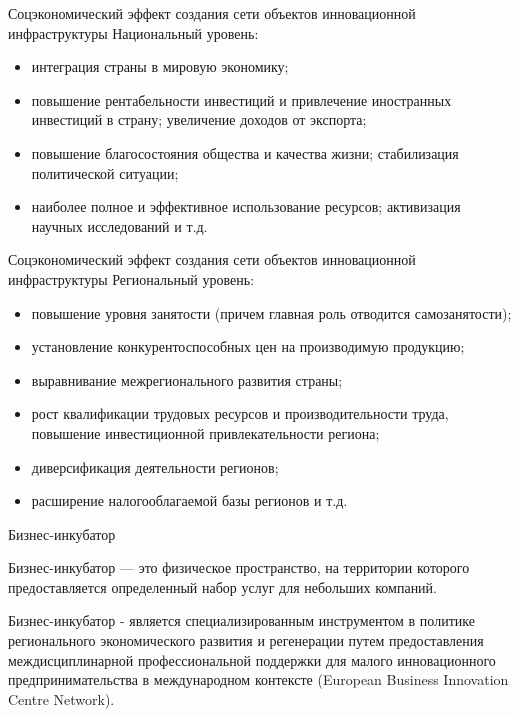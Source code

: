 \documentclass[_Venture_p3.tex]{subfiles}
\begin{document}
\begin{frame}[allowframebreaks]{Соцэкономический эффект }{создания сети объектов инновационной инфраструктуры}
Национальный уровень:
\begin{itemize}
	\item интеграция страны в мировую экономику;
	\item повышение рентабельности инвестиций и привлечение иностранных инвестиций в страну; увеличение доходов от экспорта;
	\pagebreak
	\item повышение благосостояния общества и качества жизни; стабилизация политической ситуации;
	\item наиболее полное и эффективное использование ресурсов; активизация научных исследований и т.д.
\end{itemize}
\end{frame}


\begin{frame}[allowframebreaks]{Соцэкономический эффект }{создания сети объектов инновационной инфраструктуры}
Региональный уровень:
\begin{itemize}
	\item повышение уровня занятости (причем главная роль отводится самозанятости);
	\item установление конкурентоспособных цен на производимую продукцию; 
	\item выравнивание межрегионального развития страны;
	
	\pagebreak
	\item рост квалификации трудовых ресурсов и производительности труда, повышение инвестиционной привлекательности региона; 
	\item диверсификация деятельности регионов;
	\item расширение налогооблагаемой базы регионов и т.д.	
\end{itemize}
\end{frame}


 

\begin{frame}[allowframebreaks]{Бизнес-инкубатор}{}
\begin{block}{Бизнес-инкубатор}
	\quad
	— это физическое пространство, на территории которого предоставляется определенный набор услуг для небольших компаний.
\end{block}

\pagebreak


\begin{block}{Бизнес-инкубатор}
	\quad
	-  является специализированным инструментом в политике регионального экономического развития и регенерации путем предоставления междисциплинарной профессиональной поддержки для малого инновационного предпринимательства в международном контексте (European Business Innovation Centre Network).
\end{block}
\end{frame}
\end{document}
